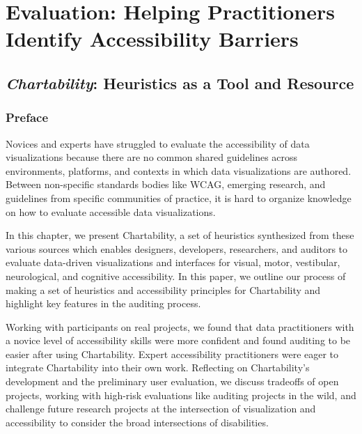 \documentclass[12pt]{cmuthesis}
\begin{document}

\part{Evaluation: Helping Practitioners Identify Accessibility Barriers}

\chapter{\textit{Chartability}: Heuristics as a Tool and Resource}

\section{Preface}
Novices and experts have struggled to evaluate the accessibility of data visualizations because there are no common shared guidelines across environments, platforms, and contexts in which data visualizations are authored. Between non-specific standards bodies like WCAG, emerging research, and guidelines from specific communities of practice, it is hard to organize knowledge on how to evaluate accessible data visualizations.

In this chapter, we present Chartability, a set of heuristics synthesized from these various sources which enables designers, developers, researchers, and auditors to evaluate data-driven visualizations and interfaces for visual, motor, vestibular, neurological, and cognitive accessibility. In this paper, we outline our process of making a set of heuristics and accessibility principles for Chartability and highlight key features in the auditing process.

Working with participants on real projects, we found that data practitioners with a novice level of accessibility skills were more confident and found auditing to be easier after using Chartability. Expert accessibility practitioners were eager to integrate Chartability into their own work. Reflecting on Chartability’s development and the preliminary user evaluation, we discuss tradeoffs of open projects, working with high-risk evaluations like auditing projects in the wild, and challenge future research projects at the intersection of visualization and accessibility to consider the broad intersections of disabilities.
\end{document}
